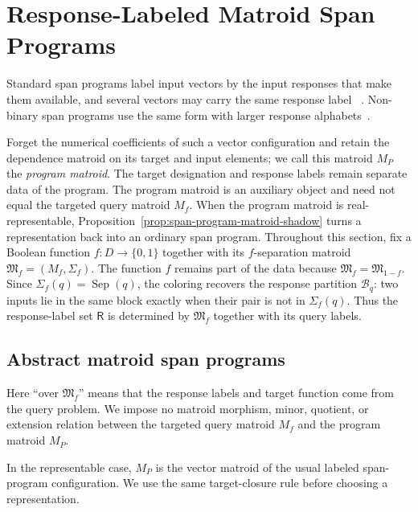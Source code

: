 \documentclass[11pt]{article}
\numberwithin{equation}{section}
\theoremstyle{remark}
\begin{document}
\section{Response-Labeled Matroid Span Programs}
\label{sec:matroid-span-programs}

Standard span programs label input vectors by the input responses that make
them available, and several vectors may carry the same response label
~\cite{KarchmerWigderson1993,Reichardt2009}. Non-binary span programs use
the same form with larger response alphabets~\cite{BeigiTaghavi2019}.

Forget the numerical coefficients of such a vector configuration and retain
the dependence matroid on its target and input elements; we call this matroid
$M_P$ the \emph{program matroid}. The target designation and response labels
remain separate data of the program. The program matroid is an auxiliary
object and need not equal the targeted query matroid $M_f$. When the program matroid is real-representable,
Proposition~\ref{prop:span-program-matroid-shadow} turns a representation
back into an ordinary span program. Throughout this section, fix a Boolean function $f:D\to\{0,1\}$ together
with its $f$-separation matroid
$\mathfrak M_f=(M_f,\Sigma_f)$. The function $f$ remains part of the data because $\mathfrak M_f=\mathfrak M_{1-f}$. Since $\Sigma_f(q)=\operatorname{Sep}(q)$, the coloring recovers the response partition $\mathcal B_q$: two inputs lie in the same block exactly when their pair is not in $\Sigma_f(q)$. Thus the response-label set $\mathsf R$ is determined by $\mathfrak M_f$ together with its query labels.

\subsection{Abstract matroid span programs}
\label{subsec:abstract-matroid-span-programs}

Here ``over $\mathfrak M_f$'' means that the response labels and target
function come from the query problem. We impose no matroid morphism, minor,
quotient, or extension relation between the targeted query matroid $M_f$ and
the program matroid $M_P$.

In the representable case, $M_P$ is the vector matroid of the usual labeled
span-program configuration. We use the same target-closure rule before
choosing a representation.
\end{document}
